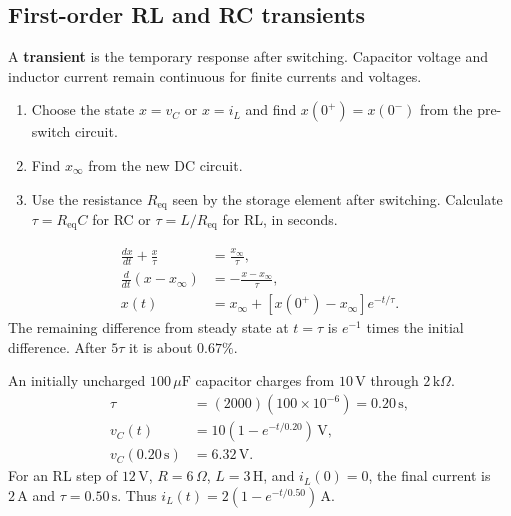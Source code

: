 \documentclass[12pt,a4paper]{article}
\begin{document}
\subsection{First-order RL and RC transients}
A \textbf{transient} is the temporary response after switching. Capacitor voltage and inductor current remain continuous for finite currents and voltages.
\begin{enumerate}[leftmargin=*, itemsep=3pt, topsep=4pt]
  \item Choose the state \(x=v_C\) or \(x=i_L\) and find \(x(0^+)=x(0^-)\) from the pre-switch circuit.
  \item Find \(x_\infty\) from the new DC circuit.
  \item Use the resistance \(R_{\mathrm{eq}}\) seen by the storage element after switching. Calculate \(\tau=R_{\mathrm{eq}}C\) for RC or \(\tau=L/R_{\mathrm{eq}}\) for RL, in seconds.
\end{enumerate}
\[
\begin{aligned}
\frac{dx}{dt}+\frac{x}{\tau}&=\frac{x_\infty}{\tau},\\
\frac{d}{dt}(x-x_\infty)&=-\frac{x-x_\infty}{\tau},\\
x(t)&=x_\infty+[x(0^+)-x_\infty]e^{-t/\tau}.
\end{aligned}
\]
The remaining difference from steady state at \(t=\tau\) is \(e^{-1}\) times the initial difference. After \(5\tau\) it is about \(0.67\%\).

\begin{tcolorbox}[tikzbox,title={Normalised first-order step responses},unbreakable]
\centering
{}
\end{tcolorbox}

\begin{tcolorbox}[examplebox,title={Time constants and initial conditions},unbreakable]
An initially uncharged \(100\,\mu\mathrm F\) capacitor charges from \(10\,\mathrm V\) through \(2\,\mathrm{k}\Omega\).
\[
\begin{aligned}
\tau&=(2000)(100\times 10^{-6})=0.20\,\mathrm s,\\
v_C(t)&=10(1-e^{-t/0.20})\,\mathrm V,\\
v_C(0.20\,\mathrm s)&=6.32\,\mathrm V.
\end{aligned}
\]
For an RL step of \(12\,\mathrm V\), \(R=6\,\Omega\), \(L=3\,\mathrm H\), and \(i_L(0)=0\), the final current is \(2\,\mathrm A\) and \(\tau=0.50\,\mathrm s\). Thus \(i_L(t)=2(1-e^{-t/0.50})\,\mathrm A\).
\end{tcolorbox}
\end{document}
